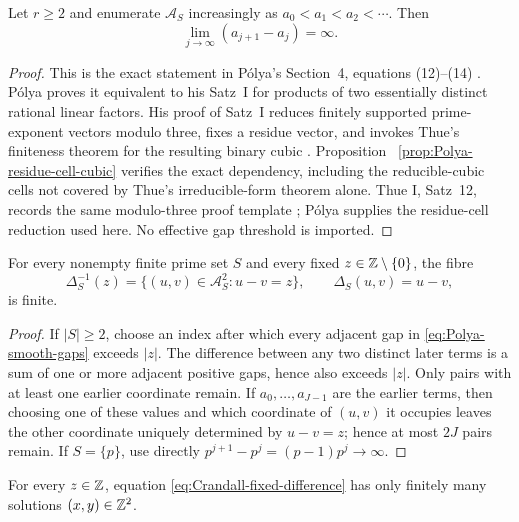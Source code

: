 \begin{theorem}
\label{thm:Polya-smooth-gaps}
Let $r\geq2$ and enumerate $\mathcal A_S$ increasingly as
$a_0<a_1<a_2<\cdots$.  Then
\begin{equation}
\label{eq:Polya-smooth-gaps}
 \lim_{j\to\infty}(a_{j+1}-a_j)=\infty.
\end{equation}
\end{theorem}

\begin{proof}
This is the exact statement in P\'olya's Section~4, equations (12)--(14)
\cite[pp.~147--148]{Polya1918}.  P\'olya proves it equivalent to his Satz~I
for products of two essentially distinct rational linear factors.  His proof
of Satz~I reduces finitely supported prime-exponent vectors modulo three,
fixes a residue vector, and invokes Thue's finiteness theorem for the resulting
binary cubic \cite[pp.~144--145]{Polya1918}.  Proposition~
\ref{prop:Polya-residue-cell-cubic} verifies the exact dependency, including
the reducible-cubic cells not covered by Thue's irreducible-form theorem
alone.  Thue I, Satz~12, records the same modulo-three proof template
\cite[pp.~30--31]{Thue1908I}; P\'olya supplies the residue-cell reduction used
here.  No effective gap threshold is imported.
\end{proof}

\begin{corollary}
\label{cor:Polya-fixed-difference-fibres}
For every nonempty finite prime set $S$ and every fixed
$z\in\mathbb{Z}\setminus\{0\}$, the
fibre
\[
 \Delta_S^{-1}(z)
 =\{(u,v)\in\mathcal A_S^2:u-v=z\},
 \qquad \Delta_S(u,v)=u-v,
\]
is finite.
\end{corollary}

\begin{proof}
If $|S|\geq2$, choose an index after which every adjacent gap in
\eqref{eq:Polya-smooth-gaps} exceeds $|z|$.  The difference between any two
distinct later terms is a sum of one or more adjacent positive gaps, hence
also exceeds $|z|$.  Only pairs with at least one earlier coordinate remain.
If $a_0,\ldots,a_{J-1}$ are the earlier terms, then choosing one of these
values and which coordinate of $(u,v)$ it occupies leaves the other
coordinate uniquely determined by $u-v=z$; hence at most $2J$ pairs remain.
If
$S=\{p\}$, use directly $p^{j+1}-p^j=(p-1)p^j\to\infty$.
\end{proof}

\begin{proposition}
\label{prop:Crandall-fixed-z-finiteness}
For every $z\in\mathbb{Z}$, equation \eqref{eq:Crandall-fixed-difference} has only
finitely many solutions $(x,y)\in\mathbb{Z}^2$.
\end{proposition}

